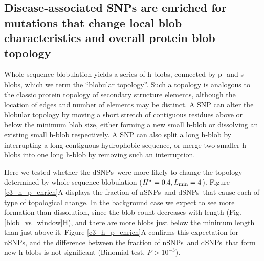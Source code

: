 \documentclass[9pt,twocolumn,twoside,lineno]{pnas-new}
\newcommand{\aucomment}[1]{}
\newcommand{\dSNPs}{dSNPs~}
\newcommand{\nSNPs}{nSNPs~}
\newcommand{\Ht}{H^{\star}}
\newcommand{\Lmin}{L_{\rm min}}
\begin{document}
\subsection*{Disease-associated SNPs are enriched for mutations that change local blob characteristics and overall protein blob topology}
\aucomment{Minor edits were made to this section for clarity.}
Whole-sequence blobulation yields a series of h-blobs, connected by p- and s-blobs, which we term the ``blobular topology''. Such a topology is analogous to the classic protein topology of secondary structure elements, although the location of edges and number of elements may be distinct. A SNP can alter the blobular topology by moving a short stretch of contiguous residues above or below the minimum blob size, either forming a new small h-blob or dissolving an existing small h-blob respectively. A SNP can also split a long h-blob by interrupting a long contiguous hydrophobic sequence, or merge two smaller h-blobs into one long h-blob by removing such an interruption. 

Here we tested whether the \dSNPs were more likely to change the topology determined by whole-sequence blobulation ($\Ht=0.4, \Lmin=4$). Figure \ref{c3_h_p_enrich}A displays the fraction of \nSNPs and \dSNPs that cause each of type of topological change. In the background case we expect to see more formation than dissolution, since the blob count decreases with length (Fig. \ref{blob_vs_window}H), and there are more blobs just below the minimum length than just above it. Figure \ref{c3_h_p_enrich}A confirms this expectation for nSNPs, and the difference between the fraction of \nSNPs and \dSNPs that form new h-blobs is not significant  (Binomial test, $P>10^{-3}$). 
\end{document}
